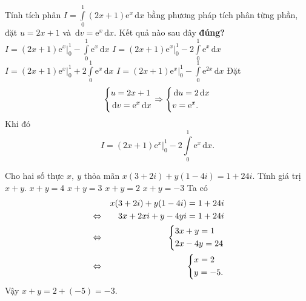 \begin{ex}%
	Tính tích phân $I=\displaystyle\int\limits_0^1 (2x+1)\mathrm{e}^x\mathrm{\,d}x$ bằng phương pháp tích phân từng phần, đặt $u=2x+1$ và $\mathrm{\,d}v=\mathrm{e}^x\mathrm{\,d}x$. Kết quả nào sau đây \textbf{đúng?}
	\choice
	{$I=(2x+1)\mathrm{e}^x\bigg|_0^1-\displaystyle\int\limits_0^1\mathrm{e}^x\mathrm{\,d}x$}
	{\True $I=(2x+1)\mathrm{e}^x\bigg|_0^1-2\displaystyle\int\limits_0^1\mathrm{e}^x\mathrm{\,d}x$}
	{$I=(2x+1)\mathrm{e}^x\bigg|_0^1+2\displaystyle\int\limits_0^1\mathrm{e}^x\mathrm{\,d}x$}
	{$I=(2x+1)\mathrm{e}^x\bigg|_0^1-\displaystyle\int\limits_0^1\mathrm{e}^{2x}\mathrm{\,d}x$}
	\loigiai
	{
		Đặt
		\[\left\{\begin{aligned}&u=2x+1\\&\mathrm{\,d}v=\mathrm{e}^x\mathrm{\,d}x\end{aligned}\right.\Rightarrow\left\{\begin{aligned}&\mathrm{\,d}u=2\mathrm{\,d}x\\&v=\mathrm{e}^x.\end{aligned}\right.\]
		Khi đó 
		\[I=(2x+1)\mathrm{e}^x\bigg|_0^1-2\displaystyle\int\limits_0^1\mathrm{e}^x\mathrm{\,d}x.\]
	}
\end{ex}

\begin{ex}%
	Cho hai số thực $x,~y$ thỏa mãn $x(3+2i)+y(1-4i)=1+24i$. Tính giá trị $x+y$.
	\choice
	{$x+y=4$}
	{$x+y=3$}
	{$x+y=2$}
	{\True $x+y=-3$}
	\loigiai
	{
		Ta có
		\begin{eqnarray*}
			& &x(3+2i)+y(1-4i)=1+24i \\
			& \Leftrightarrow &3x+2xi+y-4yi=1+24i\\
			& \Leftrightarrow &\left\{\begin{aligned}&3x+y=1\\&2x-4y=24\end{aligned}\right.\\
			& \Leftrightarrow &\left\{\begin{aligned}&x=2\\&y=-5.\end{aligned}\right.\\
		\end{eqnarray*}
		Vậy $x+y=2+(-5)=-3$.
	}
\end{ex}


